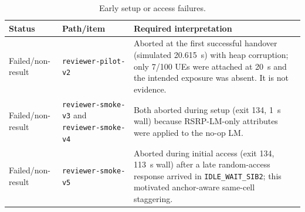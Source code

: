 \begin{table}[t]
\centering
\footnotesize
\caption{Early setup or access failures.}
\label{tab:audited_setup_failures}
\begin{tabular}{p{} p{} p{}}
\hline
Status & Path/item & Required interpretation \\
\hline
Failed/non-result & \texttt{reviewer-\allowbreak pilot-\allowbreak v2} & Aborted at the first successful handover (simulated 20.615~s) with heap corruption; only 7/100 UEs were attached at 20~s and the intended exposure was absent.  It is not evidence. \\
Failed/non-result & \texttt{reviewer-\allowbreak smoke-\allowbreak v3} and \texttt{reviewer-\allowbreak smoke-\allowbreak v4} & Both aborted during setup (exit 134, 1~s wall) because RSRP-LM-only attributes were applied to the no-op LM. \\
Failed/non-result & \texttt{reviewer-\allowbreak smoke-\allowbreak v5} & Aborted during initial access (exit 134, 113~s wall) after a late random-access response arrived in \texttt{IDLE\_\allowbreak WAIT\_\allowbreak SIB2}; this motivated anchor-aware same-cell staggering. \\
\hline
\end{tabular}
\end{table}

